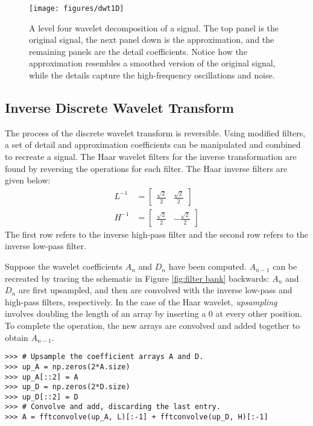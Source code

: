 \begin{figure}[H]
\centering
\texttt{[image: figures/dwt1D]}
\caption{A level four wavelet decomposition of a signal.
The top panel is the original signal, the next panel down is the approximation, and the remaining panels are the detail coefficients.
Notice how the approximation resembles a smoothed version of the original signal, while the details capture the high-frequency oscillations and noise.}
\label{fig:dwt1D}
\end{figure}

\subsection*{Inverse Discrete Wavelet Transform}

The process of the discrete wavelet transform is reversible.
Using modified filters, a set of detail and approximation coefficients can be manipulated and combined to recreate a signal.
The Haar wavelet filters for the inverse transformation are found by reversing the operations for each filter.
The Haar inverse filters are given below:
\begin{align*}
L^{-1} &= \begin{bmatrix}\frac{\sqrt{2}}{2} & \frac{\sqrt{2}}{2}\end{bmatrix}\\H^{-1}&=\begin{bmatrix}\frac{\sqrt{2}}{2}&-\frac{\sqrt{2}}{2}\end{bmatrix}
\end{align*}
The first row refers to the inverse high-pass filter and the second row refers to the inverse low-pass filter.

Suppose the wavelet coefficients $A_n$ and $D_n$ have been computed.
$A_{n-1}$ can be recreated by tracing the schematic in Figure \ref{fig:filter bank} backwards: $A_n$ and $D_n$ are first upsampled, and then are convolved with the inverse low-pass and high-pass filters, respectively.
In the case of the Haar wavelet, \emph{upsampling} involves doubling the length of an array by inserting a 0 at every other position.
To complete the operation, the new arrays are convolved and added together to obtain $A_{n-1}$.

\begin{lstlisting}
>>> # Upsample the coefficient arrays A and D.
>>> up_A = np.zeros(2*A.size)
>>> up_A[::2] = A
>>> up_D = np.zeros(2*D.size)
>>> up_D[::2] = D
>>> # Convolve and add, discarding the last entry.
>>> A = fftconvolve(up_A, L)[:-1] + fftconvolve(up_D, H)[:-1]
\end{lstlisting}


